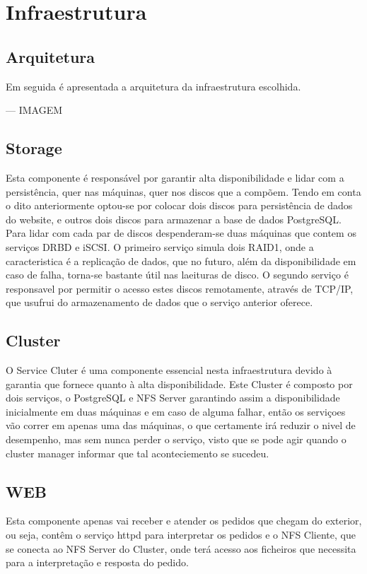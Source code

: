 \section{Infraestrutura}

\subsection{Arquitetura}

Em seguida é apresentada a arquitetura da infraestrutura escolhida.

--- IMAGEM

\subsection{Storage}
Esta componente é responsável por garantir alta disponibilidade e lidar com a persistência, quer nas máquinas, quer nos discos que a compõem. Tendo em conta o dito anteriormente optou-se por colocar dois discos para persistência de dados do website, e outros dois discos para armazenar a base de dados PostgreSQL. Para lidar com cada par de discos despenderam-se duas máquinas que contem os serviços DRBD e iSCSI. O primeiro serviço simula dois RAID1, onde a caracteristica é a replicação de dados, que no futuro, além da disponibilidade em caso de falha, torna-se bastante útil nas laeituras de disco. O segundo serviço é responsavel por permitir o acesso estes discos remotamente, através de TCP/IP, que usufrui do armazenamento de dados que o serviço anterior oferece.

\subsection{Cluster}
O Service Cluter é uma componente essencial nesta infraestrutura devido à garantia que fornece quanto à alta disponibilidade. Este Cluster é composto por dois serviços, o PostgreSQL e NFS Server garantindo assim a disponibilidade inicialmente em duas máquinas e em caso de alguma falhar, então os serviçoes vão correr em apenas uma das máquinas, o que certamente irá reduzir o nivel de desempenho, mas sem nunca perder o serviço, visto que se pode agir quando o cluster manager informar que tal aconteciemento se sucedeu.

\subsection{WEB}
Esta componente apenas vai receber e atender os pedidos que chegam do exterior, ou seja, contêm o serviço httpd para interpretar os pedidos e o NFS Cliente, que se conecta ao NFS Server do Cluster, onde terá acesso aos ficheiros que necessita para a interpretação e resposta do pedido.

